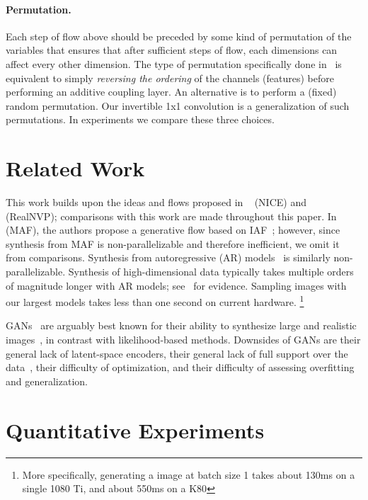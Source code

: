 \documentclass{article}
\begin{document}
\paragraph{Permutation.} Each step of flow above should be preceded by some kind of permutation of the variables that ensures that after sufficient steps of flow, each dimensions can affect every other dimension. The type of permutation specifically done in~\citep{dinh2014nice,dinh2016density} is equivalent to simply \emph{reversing the ordering} of the channels (features) before performing an additive coupling layer. An alternative is to perform a (fixed) random permutation. Our invertible 1x1 convolution is a generalization of such permutations. In experiments we compare these three choices.

\section{Related Work}
\label{sec:relatedwork}

This work builds upon the ideas and flows proposed in ~\citep{dinh2014nice} (NICE) and ~\citep{dinh2016density} (RealNVP); comparisons with this work are made throughout this paper. In~\citep{papamakarios2017masked} (MAF), the authors propose a generative flow based on IAF~\citep{kingma2016improving}; however, since synthesis from MAF is non-parallelizable and therefore inefficient, we omit it from comparisons. Synthesis from autoregressive (AR) models~\citep{hochreiter1997long,graves2013generating,pixelrnn,oord2016conditional,van2016wavenet} is similarly non-parallelizable. Synthesis of high-dimensional data typically takes multiple orders of magnitude longer with AR models; see~\citep{kingma2016improving,oord2017parallel} for evidence. Sampling  images with our largest models takes less than one second on current hardware. \footnote{More specifically, generating a  image at batch size 1 takes about 130ms on a single 1080 Ti, and about 550ms on a K80}

GANs~\citep{goodfellow2014generative} are arguably best known for their ability to synthesize large and realistic images~\citep{karras2017progressive}, in contrast with likelihood-based methods. Downsides of GANs are their general lack of latent-space encoders, their general lack of full support over the data~\citep{grover2018flow}, their difficulty of optimization, and their difficulty of assessing overfitting and generalization.



\section{Quantitative Experiments}\label{sec:experiments}
\end{document}
